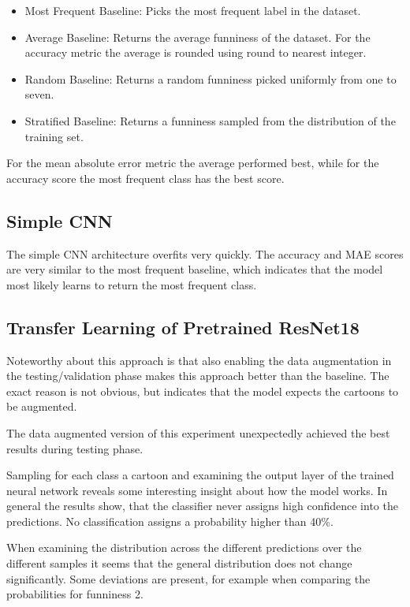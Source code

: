 \documentclass[draft,final,oneside]{vutinfth} %
\begin{document}
\begin{itemize}

\item Most Frequent Baseline: Picks the most frequent label in the dataset.
\item Average Baseline: Returns the average funniness of the dataset. For the accuracy metric the average is rounded using round to nearest integer.
\item Random Baseline: Returns a random funniness picked uniformly from one to seven.
\item Stratified Baseline: Returns a funniness sampled from the distribution of the
training set.

\end{itemize}

For the mean absolute error metric the average performed best, while for the accuracy score the most frequent class has the best score.

\subsection{Simple CNN}
The simple CNN architecture overfits very quickly. The accuracy and MAE scores are very similar to the most frequent baseline, which indicates that the model most likely learns to return the most frequent class.

\subsection{Transfer Learning of Pretrained ResNet18}
Noteworthy about this approach is that also enabling the data augmentation in the testing/validation phase makes this approach better than the baseline. The exact reason is not obvious, but indicates that the model expects the cartoons to be augmented.

The data augmented version of this experiment unexpectedly achieved the best results during testing phase.

Sampling for each class a cartoon and examining the output layer of the trained neural network reveals some interesting insight about how the model works. In general the results show, that the classifier never assigns high confidence into the predictions. No classification assigns a probability higher than 40\%.

When examining the distribution across the different predictions over the different samples it seems that the general distribution does not change significantly. Some deviations are present, for example when comparing the probabilities for funniness 2.
\end{document}
